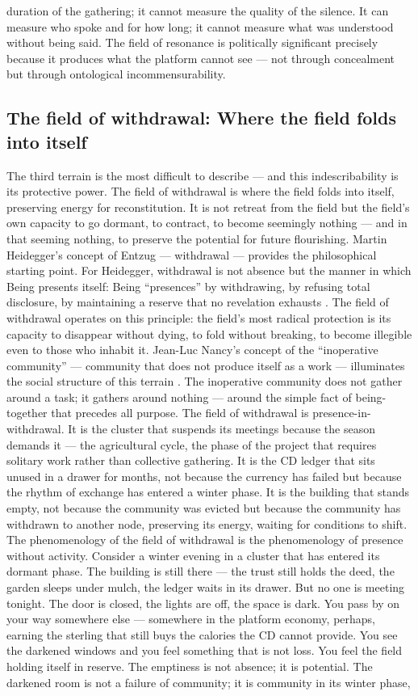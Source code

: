 duration of the gathering; it cannot measure the quality of the silence. It can measure who spoke and for how long; it cannot measure what was understood without being said. The field of resonance is politically significant precisely because it produces what the platform cannot see — not through concealment but through ontological incommensurability.

\subsection{The field of withdrawal: Where the field folds into itself}

The third terrain is the most difficult to describe — and this indescribability is its protective power. The field of withdrawal is where the field folds into itself, preserving energy for reconstitution. It is not retreat from the field but the field’s own capacity to go dormant, to contract, to become seemingly nothing — and in that seeming nothing, to preserve the potential for future flourishing. Martin Heidegger’s concept of Entzug — withdrawal — provides the philosophical starting point. For Heidegger, withdrawal is not absence but the manner in which Being presents itself: Being “presences” by withdrawing, by refusing total disclosure, by maintaining a reserve that no revelation exhausts \cite{heidegger_1954}. The field of withdrawal operates on this principle: the field’s most radical protection is its capacity to disappear without dying, to fold without breaking, to become illegible even to those who inhabit it. Jean-Luc Nancy’s concept of the “inoperative community” — community that does not produce itself as a work — illuminates the social structure of this terrain \cite[pp.~1--42]{nancy_1986}. The inoperative community does not gather around a task; it gathers around nothing — around the simple fact of being-together that precedes all purpose. The field of withdrawal is presence-in-withdrawal. It is the cluster that suspends its meetings because the season demands it — the agricultural cycle, the phase of the project that requires solitary work rather than collective gathering. It is the CD ledger that sits unused in a drawer for months, not because the currency has failed but because the rhythm of exchange has entered a winter phase. It is the building that stands empty, not because the community was evicted but because the community has withdrawn to another node, preserving its energy, waiting for conditions to shift. The phenomenology of the field of withdrawal is the phenomenology of presence without activity. Consider a winter evening in a cluster that has entered its dormant phase. The building is still there — the trust still holds the deed, the garden sleeps under mulch, the ledger waits in its drawer. But no one is meeting tonight. The door is closed, the lights are off, the space is dark. You pass by on your way somewhere else — somewhere in the platform economy, perhaps, earning the sterling that still buys the calories the CD cannot provide. You see the darkened windows and you feel something that is not loss. You feel the field holding itself in reserve. The emptiness is not absence; it is potential. The darkened room is not a failure of community; it is community in its winter phase, 
